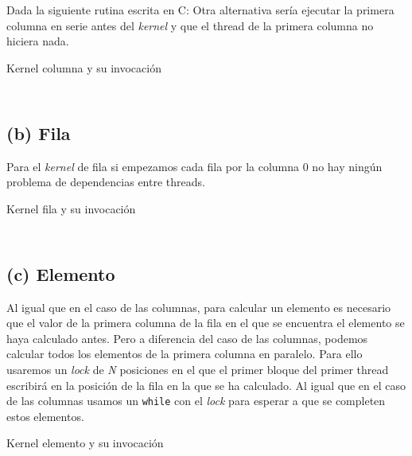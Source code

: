 \begin{pregunta}{Dada la siguiente rutina escrita en C:}
Otra alternativa sería ejecutar la primera columna en serie antes del \emph{kernel} y que el
thread de la primera columna no hiciera nada.

\begin{listing}[H]
    \caption{Kernel columna y su invocación}
    \inputminted[firstline=17,lastline=33]{cuda}{code/main.cu}
    \vspace{-2em}
    \inputminted[firstline=120,lastline=127,autogobble]{cuda}{code/main.cu}
    \label{lst:kernel-columna}
\end{listing}

\pagebreak
\subsection*{(b) Fila}

Para el \emph{kernel} de fila si empezamos cada fila por la columna 0 no hay ningún
problema de dependencias entre threads.

\begin{listing}[H]
    \caption{Kernel fila y su invocación}
    \inputminted[firstline=35,lastline=41]{cuda}{code/main.cu}
    \vspace{-2em}
    \inputminted[firstline=114,lastline=117,autogobble]{cuda}{code/main.cu}
    \label{lst:kernel-fila}
\end{listing}

\pagebreak
\subsection*{(c) Elemento}

Al igual que en el caso de las columnas, para calcular un elemento es necesario que
el valor de la primera columna de la fila en el que se encuentra el elemento se haya
calculado antes. Pero a diferencia del caso de las columnas, podemos calcular todos los
elementos de la primera columna en paralelo. Para ello usaremos un \emph{lock} de
\emph{N} posiciones en el que el primer bloque del primer thread escribirá en la posición
de la fila en la que se ha calculado. Al igual que en el caso de las columnas usamos un
\texttt{while} con el \emph{lock} para esperar a que se completen estos elementos.

\begin{listing}[H]
    \caption{Kernel elemento y su invocación}
    \inputminted[firstline=43,lastline=57]{cuda}{code/main.cu}
    \vspace{-2em}
    \inputminted[firstline=130,lastline=137,autogobble]{cuda}{code/main.cu}
    \label{lst:kernel-elemento}
\end{listing}

\end{pregunta}


